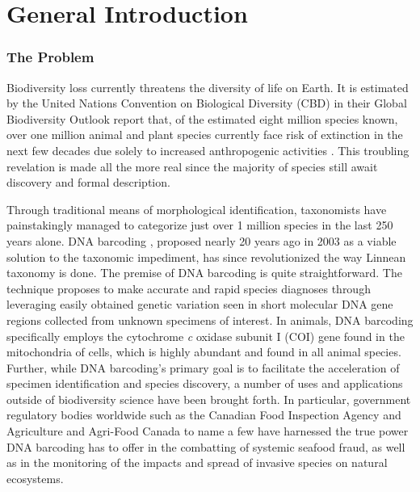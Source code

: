 \linespread{1.0}

\chapter{General Introduction}

\subsection{The Problem}

Biodiversity loss currently threatens the diversity of life on Earth. It is estimated by the United Nations Convention on Biological Diversity (CBD) in their Global Biodiversity Outlook report that, of the estimated eight million species known, over one million animal and plant species currently face risk of extinction in the next few decades due solely to increased anthropogenic activities \cite{cbd2020global}. This troubling revelation is made all the more real since the majority of species still await discovery and formal description. 

\vspace{5mm}

Through traditional means of morphological identification, taxonomists have \\ painstakingly managed to categorize just over 1 million species in the last 250 years alone. DNA barcoding \cite{hebert2003biological, hebert2003barcoding}, proposed nearly 20 years ago in 2003 as a viable solution to the taxonomic impediment, has since revolutionized the way Linnean taxonomy is done. The premise of DNA barcoding is quite straightforward. The technique proposes to make accurate and rapid species diagnoses through leveraging easily obtained genetic variation seen in short molecular DNA gene regions collected from unknown specimens of interest. In animals, DNA barcoding specifically employs the cytochrome \textit{c} oxidase subunit I (COI) gene found in the mitochondria of cells, which is highly abundant and found in all animal species. Further, while DNA barcoding's primary goal is to facilitate the acceleration of specimen identification and species discovery, a number of uses and applications outside of biodiversity science have been brought forth. In particular, government regulatory bodies worldwide such as the Canadian Food Inspection Agency and Agriculture and Agri-Food Canada to name a few have harnessed the true power DNA barcoding has to offer in the combatting of systemic seafood fraud, as well as in the monitoring of the impacts and spread of invasive species on natural ecosystems.

